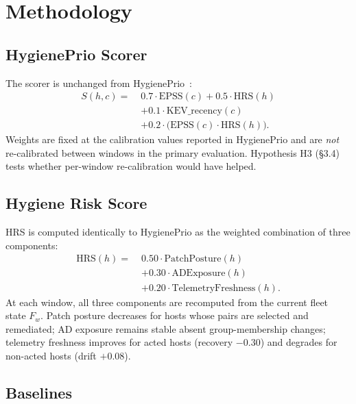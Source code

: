 \section{Methodology}

\subsection{HygienePrio Scorer}

The scorer is unchanged from HygienePrio~\cite{paper4hygieneprio}:
\begin{equation}
\begin{aligned}
S(h,c) =\;& 0.7 \cdot \mathrm{EPSS}(c) + 0.5 \cdot \mathrm{HRS}(h) \\
          & + 0.1 \cdot \mathrm{KEV\_recency}(c) \\
          & + 0.2 \cdot \bigl(\mathrm{EPSS}(c) \cdot \mathrm{HRS}(h)\bigr).
\end{aligned}
\label{eq:scorer}
\end{equation}
Weights are fixed at the calibration values reported in HygienePrio and are \textit{not} re-calibrated between windows in the primary evaluation. Hypothesis H3 (\S3.4) tests whether per-window re-calibration would have helped.

\subsection{Hygiene Risk Score}

HRS is computed identically to HygienePrio as the weighted combination of three components:
\begin{equation}
\begin{aligned}
\mathrm{HRS}(h) =\;& 0.50 \cdot \mathrm{PatchPosture}(h) \\
                  & + 0.30 \cdot \mathrm{ADExposure}(h) \\
                  & + 0.20 \cdot \mathrm{TelemetryFreshness}(h).
\end{aligned}
\end{equation}
At each window, all three components are recomputed from the current fleet state $F_w$. Patch posture decreases for hosts whose pairs are selected and remediated; AD exposure remains stable absent group-membership changes; telemetry freshness improves for acted hosts (recovery $-0.30$) and degrades for non-acted hosts (drift $+0.08$).

\subsection{Baselines}

